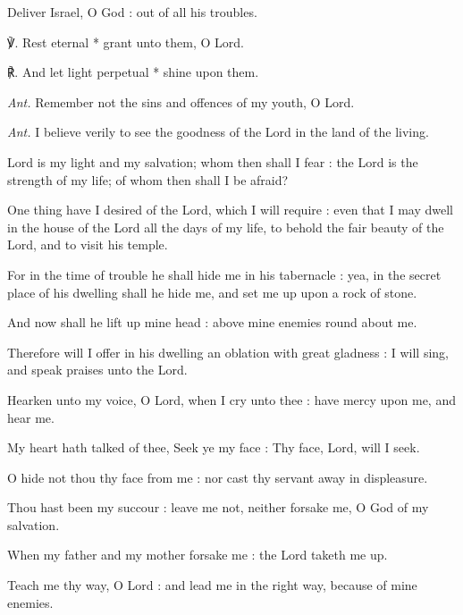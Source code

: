 Deliver Israel, O God : out of all his troubles.\par
℣. Rest eternal * grant unto them, O Lord.\par
℟. And let light perpetual * shine upon them.\par\noindent
\textit{Ant.} Remember not the sins and offences of my youth, O Lord.\par
{}\par\noindent
\textit{Ant.} I believe {\dag} verily to see the goodness of the Lord in the land of the living.\par
{} Lord is my light and my salvation; whom then shall I fear : the Lord is the strength of my life; of whom then shall I be afraid?\par
{}
One thing have I desired of the Lord, which I will require : even that I may dwell in the house of the Lord all the days of my life, to behold the fair beauty of the Lord, and to visit his temple.\par
{}For in the time of trouble he shall hide me in his tabernacle : yea, in the secret place of his dwelling shall he hide me, and set me up upon a rock of stone.\par
{}And now shall he lift up mine head : above mine enemies round about me.\par
{}Therefore will I offer in his dwelling an oblation with great gladness : I will sing, and speak praises unto the Lord.\par
{}Hearken unto my voice, O Lord, when I cry unto thee : have mercy upon me, and hear me.\par
{}My heart hath talked of thee, Seek ye my face : Thy face, Lord, will I seek.\par
{}O hide not thou thy face from me : nor cast thy servant away in displeasure.\par
{}Thou hast been my succour : leave me not, neither forsake me, O God of my salvation.\par
{}When my father and my mother forsake me : the Lord taketh me up.\par
{}Teach me thy way, O Lord : and lead me in the right way, because of mine enemies.\par
